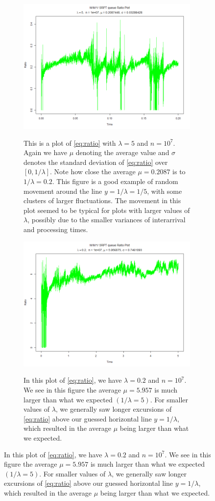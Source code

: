 \documentclass[12pt]{article}
\theoremstyle{plain}
\theoremstyle{definition}
\theoremstyle{remark}
\begin{document}
\begin{figure}[H]
\centering
\begin{subfigure}[t]{9cm}
\centering
\includegraphics[width=9cm]{Pictures/ratio5.png}
\label{fig:ratio5}
\captionsetup{width = 8cm}
\caption{This is a plot of \eqref{eq:ratio} with $\lambda = 5$ and $n = 10^{7}$. Again we have $\mu$ denoting the average value and $\sigma$ denotes the standard deviation of \eqref{eq:ratio} over $[0,1/\lambda]$. Note how close the average $\mu = 0.2087$ is to $1/\lambda = 0.2$. This figure is a good example of random movement around the line $y = 1/\lambda = 1/5$, with some clusters of larger fluctuations. The movement in this plot seemed to be typical for plots with larger values of $\lambda$, possibly due to the smaller variances of interarrival and processing times.}
\end{subfigure}%
\begin{subfigure}[t]{9cm}
\centering
\includegraphics[width=9cm]{Pictures/ratio02.png}
\label{fig:ratio02}
\captionsetup{width=8cm}
\caption{In this plot of \eqref{eq:ratio}, we have $\lambda = 0.2$ and $n = 10^{7}$. We see in this figure the average $\mu = 5.957$ is much larger than what we expected $(1/\lambda = 5)$. For smaller values of $\lambda$, we generally saw longer excursions of \eqref{eq:ratio} above our guessed horizontal line $y = 1/\lambda$, which resulted in the average $\mu$ being larger than what we expected.}
\end{subfigure}
\end{figure}
\end{document}

